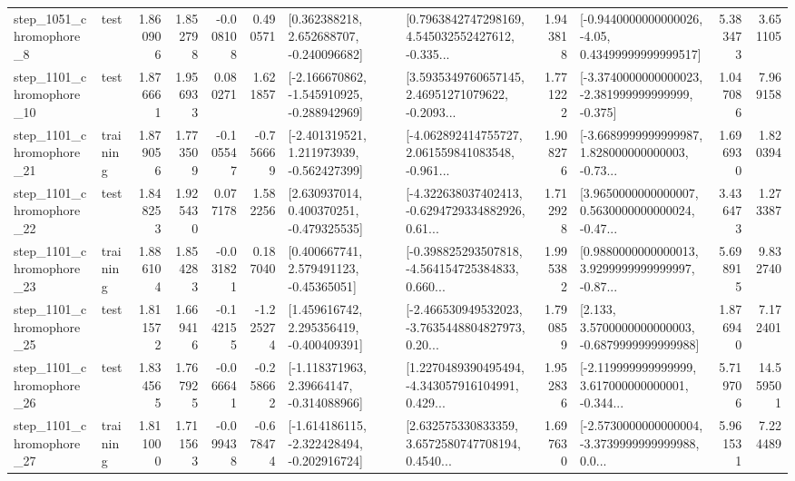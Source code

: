 \begin{tabular}{llrrrrllrlrr}
  step\_1051\_chromophore\_8 &      test &      1.860906 &    1.852798 &     -0.008108 &  0.490571 &    [0.362388218, 2.652688707, -0.240096682] &  [0.7963842747298169, 4.545032552427612, -0.335... &       1.943818 &  [-0.9440000000000026, -4.05, 0.43499999999999517] &            5.383473 &          3.651105 \\
 step\_1101\_chromophore\_10 &      test &      1.876661 &    1.956933 &      0.080271 &  1.621857 &  [-2.166670862, -1.545910925, -0.288942969] &  [3.5935349760657145, 2.46951271079622, -0.2093... &       1.771222 &  [-3.3740000000000023, -2.381999999999999, -0.375] &            1.047086 &          7.969158 \\
 step\_1101\_chromophore\_21 &  training &      1.879056 &    1.773509 &     -0.105547 & -0.756669 &   [-2.401319521, 1.211973939, -0.562427399] &  [-4.062892414755727, 2.061559841083548, -0.961... &       1.908276 &  [-3.6689999999999987, 1.828000000000003, -0.73... &            1.696930 &          1.820394 \\
 step\_1101\_chromophore\_22 &      test &      1.848253 &    1.925430 &      0.077178 &  1.582256 &    [2.630937014, 0.400370251, -0.479325535] &  [-4.322638037402413, -0.6294729334882926, 0.61... &       1.712928 &  [3.9650000000000007, 0.5630000000000024, -0.47... &            3.436473 &          1.273387 \\
 step\_1101\_chromophore\_23 &  training &      1.886104 &    1.854283 &     -0.031821 &  0.187040 &     [0.400667741, 2.579491123, -0.45365051] &  [-0.398825293507818, -4.564154725384833, 0.660... &       1.995382 &  [0.9880000000000013, 3.9299999999999997, -0.87... &            5.698915 &          9.832740 \\
 step\_1101\_chromophore\_25 &      test &      1.811572 &    1.669416 &     -0.142155 & -1.225274 &    [1.459616742, 2.295356419, -0.400409391] &  [-2.466530949532023, -3.7635448804827973, 0.20... &       1.790859 &   [2.133, 3.5700000000000003, -0.6879999999999988] &            1.876940 &          7.172401 \\
 step\_1101\_chromophore\_26 &      test &      1.834565 &    1.767925 &     -0.066641 & -0.258662 &    [-1.118371963, 2.39664147, -0.314088966] &  [1.2270489390495494, -4.343057916104991, 0.429... &       1.952836 &  [-2.119999999999999, 3.617000000000001, -0.344... &            5.719706 &         14.559501 \\
 step\_1101\_chromophore\_27 &  training &      1.811000 &    1.711563 &     -0.099438 & -0.678474 &  [-1.614186115, -2.322428494, -0.202916724] &  [2.632575330833359, 3.6572580747708194, 0.4540... &       1.697630 &  [-2.5730000000000004, -3.3739999999999988, 0.0... &            5.961531 &          7.224489 \\

\end{tabular}
